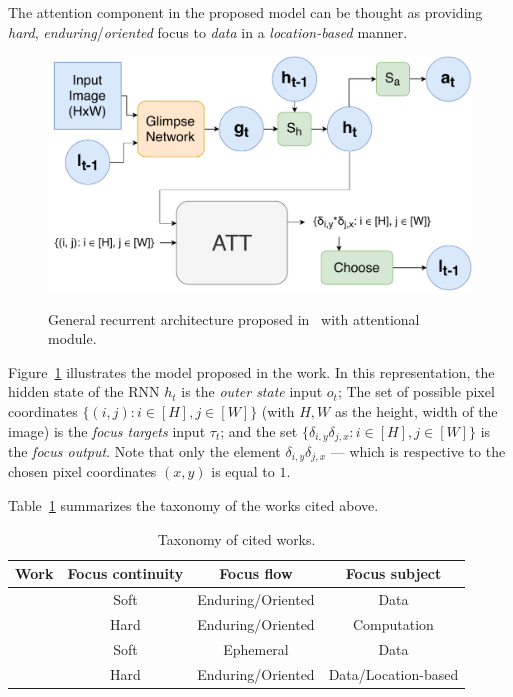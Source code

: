 \documentclass[11pt]{article}
\begin{document}
The attention component in the proposed model can be thought as providing
\emph{hard}, \emph{enduring}/\emph{oriented} focus to \emph{data} in a \emph{location-based} manner.

\begin{figure}[H]
    \centering
    \includegraphics[width=0.7\linewidth]{./img/ram.pdf}\label{fig:ram}
    \caption{General recurrent architecture proposed in~\cite{ref:ram} with attentional module.}
\end{figure}

Figure~\ref{fig:ram} illustrates the model proposed in the work.
In this representation, the hidden state of the RNN $h_t$ is the \emph{outer state} input $o_t$;
The set of possible pixel coordinates $\{(i, j): i \in [H], j \in [W]\}$ (with $H, W$ as the height, width of the image)
is the \emph{focus targets} input $\tau_t$;
and the set $\{\delta_{i, y}\delta_{j, x}: i \in [H], j \in [W]\}$ is the \emph{focus output}.
Note that only the element $\delta_{i, y}\delta_{j,x}$ --- which is respective to the chosen pixel coordinates $(x, y)$
is equal to $1$.

Table~\ref{tab:tx} summarizes the taxonomy of the works cited above.
\begin{table}[H]
\centering
\caption{\small Taxonomy of cited works.}
    \begin{tabular}{|c|c|c|c|}
	\hline
     Work & Focus continuity & Focus flow & Focus subject\\
    \hline~\cite{ref:show-attend-tell} & Soft & Enduring/Oriented & Data\\
    \hline~\cite{ref:act} & Hard & Enduring/Oriented & Computation\\
    \hline~\cite{ref:act} & Soft & Ephemeral & Data\\
    \hline~\cite{ref:ram} & Hard & Enduring/Oriented & Data/Location-based\\
    \hline
\end{tabular}
\label{tab:tx}
\end{table}

\printbibliography
\end{document}
